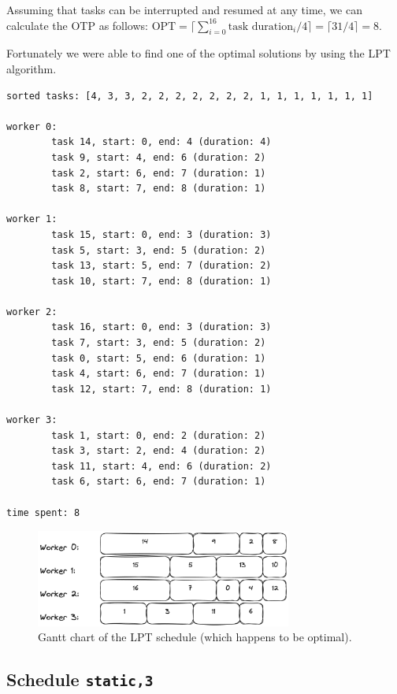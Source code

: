 \documentclass[a4paper,%
7pt,%
DIV12,
headsepline,%
headings=normal,
]{scrartcl}
\begin{document}
Assuming that tasks can be interrupted and resumed at any time, we can calculate the OTP as follows: $\text{OPT} = \lceil \sum_{i=0}^{16} \text{task duration}_i / 4 \rceil = \lceil 31 / 4 \rceil = 8$.

Fortunately we were able to find one of the optimal solutions by using the LPT algorithm.



\begin{lstlisting}
sorted tasks: [4, 3, 3, 2, 2, 2, 2, 2, 2, 2, 1, 1, 1, 1, 1, 1, 1]

worker 0:
        task 14, start: 0, end: 4 (duration: 4)
        task 9, start: 4, end: 6 (duration: 2)
        task 2, start: 6, end: 7 (duration: 1)
        task 8, start: 7, end: 8 (duration: 1)

worker 1:
        task 15, start: 0, end: 3 (duration: 3)
        task 5, start: 3, end: 5 (duration: 2)
        task 13, start: 5, end: 7 (duration: 2)
        task 10, start: 7, end: 8 (duration: 1)

worker 2:
        task 16, start: 0, end: 3 (duration: 3)
        task 7, start: 3, end: 5 (duration: 2)
        task 0, start: 5, end: 6 (duration: 1)
        task 4, start: 6, end: 7 (duration: 1)
        task 12, start: 7, end: 8 (duration: 1)

worker 3:
        task 1, start: 0, end: 2 (duration: 2)
        task 3, start: 2, end: 4 (duration: 2)
        task 11, start: 4, end: 6 (duration: 2)
        task 6, start: 6, end: 7 (duration: 1)

time spent: 8
\end{lstlisting}

\begin{figure}[htbp]
    \centering
    \includegraphics[width=0.75\textwidth]{./assets/gantt_lpt.png}
    \caption{Gantt chart of the LPT schedule (which happens to be optimal).}
    \label{fig:gantt_lpt}
\end{figure}

\subsection{Schedule \texttt{static,3}}
\end{document}
